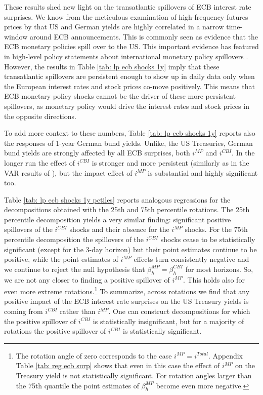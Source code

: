 \documentclass[a4paper,12pt]{article}
\begin{document}
These results shed new light on the transatlantic spillovers of ECB interest rate surprises.
We know from the meticulous examination of high-frequency futures prices by \cite{Curcuru_DePooter_Eckerd_2018} that US and German yields are highly correlated in a narrow time-window around ECB announcements. 
This is commonly seen as evidence that the ECB monetary policies spill over to the US.
This important evidence has featured
in high-level policy statements about international monetary policy spillovers \citep{Powell_2018,Clarida_2021}. 
However, the results in Table \ref{tab: lp ecb shocks 1y} imply that these transatlantic spillovers
are persistent enough to show up in daily data only when the European interest rates and stock prices co-move positively.
This means that ECB monetary policy shocks cannot be the driver of these more persistent spillovers, as monetary
policy would drive the interest rates and stock prices in the opposite directions.

To add more context to these numbers, Table \ref{tab: lp ecb shocks 1y}  reports also the responses of 1-year German bund yields. Unlike, the US Treasuries, German bund yields are strongly affected by all ECB surprises,
both $i^{MP}$ and $i^{CBI}$.
In the longer run the effect of $i^{CBI}$ is stronger and more persistent (similarly as in the VAR results of \citealp{Jarocinski_Karadi_2020}), but the impact effect of $i^{MP}$ is substantial and highly significant too. 

Table \ref{tab: lp ecb shocks 1y pctiles} reports analogous regressions for the decompositions obtained with the 25th and 75th percentile rotations. The 25th percentile decomposition yields a very similar finding: significant positive spillovers of the $i^{CBI}$ shocks
and their absence for the $i^{MP}$ shocks. For the 75th percentile decomposition the spillovers
of the $i^{CBI}$ shocks cease to be statistically significant (except for the 3-day horizon)
but their point estimates continue to be positive, while the point estimates of $i^{MP}$
effects turn consistently negative and we continue to reject the null hypothesis that $\beta^{MP}_h=\beta^{CBI}_h$ for most horizons. So, we are not any closer to finding a positive spillover of $i^{MP}$. This holds also for even more extreme rotations.\footnote{The rotation angle of zero corresponds to the case $i^{MP}=i^{Total}$. Appendix Table \ref{tab: reg ecb surp} shows that even in this case the effect of $i^{MP}$ on the Treasury yield is not statistically significant.
For rotation angles larger than the 75th quantile the point estimates of $\beta_h^{MP}$ become even more negative.} To summarize, across rotations we find that any positive impact of the ECB interest rate surprises on the US Treasury yields is coming from $i^{CBI}$ rather than $i^{MP}$. One can construct decompositions for which the positive spillover of $i^{CBI}$ is statistically insignificant, but for a majority of rotations the positive spillover of $i^{CBI}$ is statistically significant.
\end{document}
